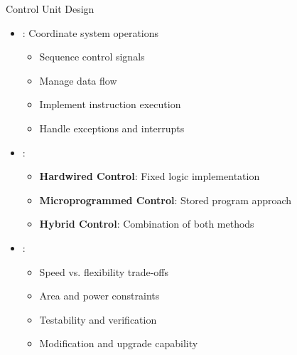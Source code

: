 \begin{frame}{Control Unit Design}
\begin{itemize}
\item {}: Coordinate system operations
\begin{itemize}
\item Sequence control signals
\item Manage data flow
\item Implement instruction execution
\item Handle exceptions and interrupts
\end{itemize}
\vspace{0.5cm}
\item {}:
\begin{itemize}
\item \textbf{Hardwired Control}: Fixed logic implementation
\item \textbf{Microprogrammed Control}: Stored program approach
\item \textbf{Hybrid Control}: Combination of both methods
\end{itemize}
\vspace{0.3cm}
\item {}:
\begin{itemize}
\item Speed vs. flexibility trade-offs
\item Area and power constraints
\item Testability and verification
\item Modification and upgrade capability
\end{itemize}
\end{itemize}
\end{frame}

